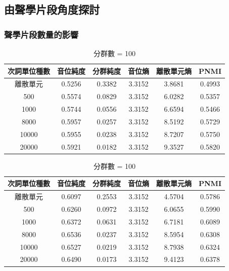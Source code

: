 \subsection{由聲學片段角度探討}
{
\subsubsection{聲學片段數量的影響}


{
\begin{table}[!htbp]
    \centering
    \begin{subtable}[t]{\textwidth}
        \centering
        \begin{tabular}{|c|c|c|c|c|c|} \hline 
                次詞單位種數& 音位純度 & 分群純度 & 音位熵 & 離散單元熵 &    PNMI \\ \hline 
離散單元& 0.5256& 0.3382& 3.3152& 3.8681& 0.4993\\ \hline 
                   500  &   0.5574   &  0.0829 &   3.3152  &  6.0282 & 0.5357 \\ \hline %
                  1000  &   0.5744   &  0.0556 &   3.3152  &  6.6594 & 0.5466 \\ \hline %
                  8000  &   0.5957   &  0.0257 &   3.3152  &  8.5192 & 0.5729 \\ \hline %
                 10000  &   0.5955   &  0.0238 &   3.3152  &  8.7207 & 0.5750 \\ \hline %
                 20000  &   0.5921   &  0.0182 &   3.3152  &  9.3527 & 0.5820 \\ \hline %
        \end{tabular}
\caption{分群數 = 50}
        \label{tab:ch4-hubert-phn-clu050}
    \end{subtable}        
    \jefftablesep        
    \begin{subtable}[t]{\textwidth}
        \centering
        \begin{tabular}{|c|c|c|c|c|c|} \hline 
                次詞單位種數& 音位純度 & 分群純度 & 音位熵 & 離散單元熵 &    PNMI \\ \hline 
離散單元& 0.6097& 0.2553& 3.3152& 4.5704& 0.5786\\ \hline 
                   500  &   0.6260   &  0.0972 &   3.3152  &  6.0655 & 0.5990 \\ \hline %
                  1000  &   0.6372   &  0.0631 &   3.3152  &  6.7181 & 0.6089 \\ \hline %
                  8000  &   0.6536   &  0.0237 &   3.3152  &  8.5954 & 0.6308 \\ \hline %
                 10000  &   0.6527   &  0.0219 &   3.3152  &  8.7938 & 0.6324 \\ \hline %
                 20000  &   0.6490   &  0.0173 &   3.3152  &  9.4123 & 0.6378 \\ \hline %
        \end{tabular}
\caption{分群數 = 100}
        \label{tab:ch4-hubert-phn-clu100}
    \end{subtable}        



\end{table}}}
